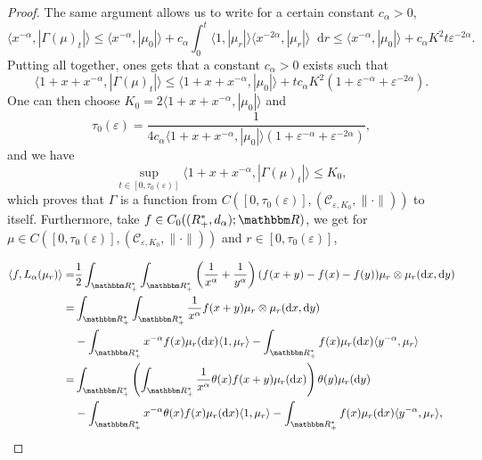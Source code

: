 \documentclass[a4paper,11pt, reqno]{amsart}
\newcommand{\cC}{\mathcal{C}}	\newcommand{\CC}{\mathbbm{C}}
\newcommand{\eps}{\varepsilon}
\newcommand{\dd}{\mathop{}\!\mathrm{d}}
\newcommand{\1}{\mathbbm{1}}
\theoremstyle{plain}
\theoremstyle{definition}
\begin{document}
\begin{proof}
  The same argument allows us to write for a certain constant $c_{\alpha} >
  0$,
  \[ \langle x^{- \alpha}, | \Gamma (\mu)_t | \rangle \le \langle x^{-
     \alpha}, | \mu_0 | \rangle + c_{\alpha} \int_0^t \langle 1, | \mu_r |
     \rangle \langle x^{- 2 \alpha}, | \mu_r | \rangle \dd r \le
     \langle x^{- \alpha}, | \mu_0 | \rangle + c_{\alpha} K^2 t \eps^{-
     2 \alpha} . \]
  Putting all together, ones gets that a constant $c_{\alpha} > 0$ exists such
  that
  \[ \langle 1 + x + x^{- \alpha}, | \Gamma (\mu)_t | \rangle \le
     \langle 1 + x + x^{- \alpha}, | \mu_0 | \rangle + t c_{\alpha} K^2 (1 +
     \eps^{- \alpha} + \eps^{- 2 \alpha}) . \]
  One can then choose $K_0 = 2 \langle 1 + x + x^{- \alpha}, | \mu_0 |
  \rangle$ and
  \[ \tau_0 (\eps) = \frac{1}{4 c_{\alpha} \langle 1 + x + x^{-
     \alpha}, | \mu_0 | \rangle (1 + \eps^{- \alpha} + \eps^{- 2
     \alpha})}, \]
  and we have
  \[ \underset{t \in [0, \tau_0 (\eps)]}{\sup} \langle 1 + x + x^{-
     \alpha}, | \Gamma (\mu)_t | \rangle \le K_0, \]
  which proves that $\Gamma$ is a function from $C ([0, \tau_0 (\eps)],
  (\cC_{\eps, K_0}, \| \cdot \|))$ to itself. Furthermore,
  take $f \in C_0 ((R_+^{\ast}, d_{\alpha}) ; \RR)$, we get for $\mu
  \in C ([0, \tau_0 (\eps)], (\cC_{\eps, K_0}, \|
  \cdot \|))$ and $r \in [0, \tau_0 (\eps)]$,
  
  \begin{align*}
    \langle f, L_{\alpha} (\mu_r) \rangle = & \frac{1}{2}
    \int_{\RR^{\ast}_+} \int_{\RR^{\ast}_+} \left(
    \frac{1}{x^{\alpha}} + \frac{1}{y^{\alpha}} \right) (f (x + y) - f (x) - f
    (y)) \mu_r \otimes \mu_r (\dd x, \dd y)\\
    = & \int_{\RR^{\ast}_+} \int_{\RR^{\ast}_+}
    \frac{1}{x^{\alpha}} f (x + y) \mu_r \otimes \mu_r (\dd x, \dd y)\\
    & - \int_{\RR^{\ast}_+} x^{- \alpha} f (x) \mu_r (\dd x)
    \langle 1, \mu_r \rangle - \int_{\RR^{\ast}_+} f (x) \mu_r (\dd
    x) \langle y^{- \alpha}, \mu_r \rangle\\
    = & \int_{\RR^{\ast}_+} \left( \int_{\RR^{\ast}_+}
    \frac{1}{x^{\alpha}} \theta (x) f (x + y) \mu_r (\dd x) \right) \theta
    (y) \mu_r (\dd y)\\
    & - \int_{\RR^{\ast}_+} x^{- \alpha} \theta (x) f (x) \mu_r
    (\dd x) \langle 1, \mu_r \rangle - \int_{\RR^{\ast}_+} f (x)
    \mu_r (\dd x) \langle y^{- \alpha}, \mu_r \rangle,
  \end{align*}
  

\end{proof}
\end{document}
